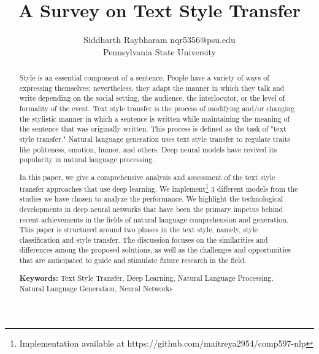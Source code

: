 \documentclass[akbc,twoside,11pt]{article}
\begin{document}
\title{A Survey on Text Style Transfer}


\author{\name Siddharth Raybharam \email nqr5356@psu.edu \\
        \addr Pennsylvania State University
       }

\maketitle
\begin{abstract}
Style is an essential component of a sentence. People have a variety of ways of expressing themselves; nevertheless, they adapt the manner in which they talk and write depending on the social setting, the audience, the interlocutor, or the level of formality of the event. Text style transfer is the process of modifying and/or changing the stylistic manner in which a sentence is written while maintaining the meaning of the sentence that was originally written. This process is defined as the task of "text style transfer." Natural language generation uses text style transfer to regulate traits like politeness, emotion, humor, and others. Deep neural models have revived its popularity in natural language processing.

In this paper, we give a comprehensive analysis and assessment of the text style transfer approaches that use deep learning. We implement\footnote{Implementation available at https://github.com/maitreya2954/comp597-nlp} 3 different models from the studies we have chosen to analyze the performance. We highlight the technological developments in deep neural networks that have been the primary impetus behind recent achievements in the fields of natural language comprehension and generation. This paper is structured around two phases in the text style, namely, style classification and style transfer. The discussion focuses on the similarities and differences among the proposed solutions, as well as the challenges and opportunities that are anticipated to guide and stimulate future research in the field.

\noindent\textbf{Keywords: }Text Style Transfer, Deep Learning, Natural Language Processing, Natural Language Generation, Neural Networks
    
\end{abstract}
\end{document}
